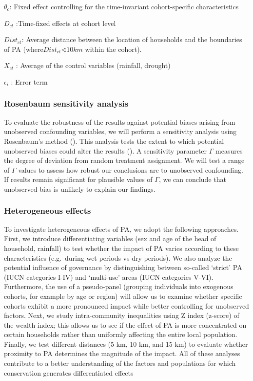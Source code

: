 \documentclass[
]{article}
\begin{document}
\({θ}_{c}\): Fixed effect controlling for the time-invariant
cohort-specific characteristics

\({D}_{c t}\) :Time-fixed effects at cohort level

\({{Dist}_{ct}}\): Average distance between the location of households
and the boundaries of PA (where\({{Dist}_{ct}} ∢ 10 km\) within the
cohort).

\({{X}_{c t}}\) : Average of the control variables (rainfall, drought)

\({ϵ}_{i}\) : Error term

\subsubsection{Rosenbaum sensitivity
analysis}\label{rosenbaum-sensitivity-analysis}

To evaluate the robustness of the results against potential biases
arising from unobserved confounding variables, we will perform a
sensitivity analysis using Rosenbaum's method
(). This analysis tests the extent to which potential unobserved
biases could alter the results
(). A sensitivity
parameter \(Γ\) measures the degree of deviation from random treatment
assignment. We will test a range of \(Γ\) values to assess how robust
our conclusions are to unobserved confounding. If results remain
significant for plausible values of \(Γ\), we can conclude that
unobserved bias is unlikely to explain our findings.

\subsubsection{Heterogeneous effects}\label{heterogeneous-effects}

To investigate heterogeneous effects of PA, we adopt the following
approaches. First, we introduce differentiating variables (sex and age
of the head of household, rainfall) to test whether the impact of PA
varies according to these characteristics (e.g.~during wet periods vs
dry periods). We also analyze the potential influence of governance by
distinguishing between so-called `strict' PA (IUCN categories I-IV) and
`multi-use' areas (IUCN categories V-VI). Furthermore, the use of a
pseudo-panel (grouping individuals into exogenous cohorts, for example
by age or region) will allow us to examine whether specific cohorts
exhibit a more pronounced impact while better controlling for unobserved
factors. Next, we study intra-community inequalities using Z index
(z-score) of the wealth index; this allows us to see if the effect of PA
is more concentrated on certain households rather than uniformly
affecting the entire local population. Finally, we test different
distances (5 km, 10 km, and 15 km) to evaluate whether proximity to PA
determines the magnitude of the impact. All of these analyses contribute
to a better understanding of the factors and populations for which
conservation generates differentiated effects
\end{document}
